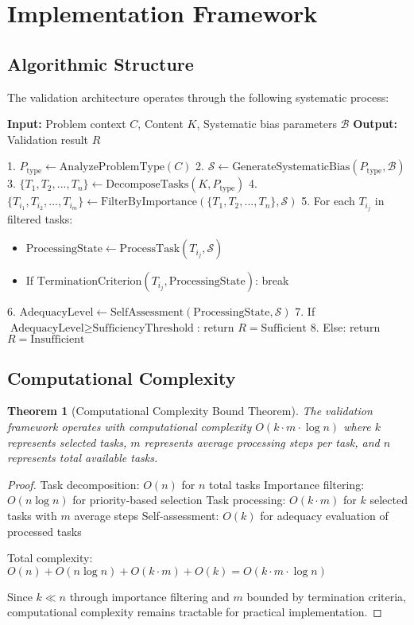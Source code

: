 \documentclass[12pt,a4paper]{article}
\newtheorem{theorem}{Theorem}
\begin{document}
\section{Implementation Framework}

\subsection{Algorithmic Structure}

The validation architecture operates through the following systematic process:

\begin{algorithm}
\textbf{Input:} Problem context $C$, Content $K$, Systematic bias parameters $\mathcal{B}$
\textbf{Output:} Validation result $R$

1. $P_{\text{type}} \leftarrow \text{AnalyzeProblemType}(C)$
2. $\mathcal{S} \leftarrow \text{GenerateSystematicBias}(P_{\text{type}}, \mathcal{B})$
3. $\{T_1, T_2, ..., T_n\} \leftarrow \text{DecomposeTasks}(K, P_{\text{type}})$
4. $\{T_{i_1}, T_{i_2}, ..., T_{i_m}\} \leftarrow \text{FilterByImportance}(\{T_1, T_2, ..., T_n\}, \mathcal{S})$
5. For each $T_{i_j}$ in filtered tasks:
   \begin{itemize}
   \item $\text{ProcessingState} \leftarrow \text{ProcessTask}(T_{i_j}, \mathcal{S})$
   \item If $\text{TerminationCriterion}(T_{i_j}, \text{ProcessingState})$: break
   \end{itemize}
6. $\text{AdequacyLevel} \leftarrow \text{SelfAssessment}(\text{ProcessingState}, \mathcal{S})$
7. If $\text{AdequacyLevel} \geq \text{SufficiencyThreshold}$: return $R = \text{Sufficient}$
8. Else: return $R = \text{Insufficient}$
\end{algorithm}

\subsection{Computational Complexity}

\begin{theorem}[Computational Complexity Bound Theorem]
The validation framework operates with computational complexity $O(k \cdot m \cdot \log n)$ where $k$ represents selected tasks, $m$ represents average processing steps per task, and $n$ represents total available tasks.
\end{theorem}

\begin{proof}
Task decomposition: $O(n)$ for $n$ total tasks
Importance filtering: $O(n \log n)$ for priority-based selection
Task processing: $O(k \cdot m)$ for $k$ selected tasks with $m$ average steps
Self-assessment: $O(k)$ for adequacy evaluation of processed tasks

Total complexity: $O(n) + O(n \log n) + O(k \cdot m) + O(k) = O(k \cdot m \cdot \log n)$

Since $k \ll n$ through importance filtering and $m$ bounded by termination criteria, computational complexity remains tractable for practical implementation.
\end{proof}
\end{document}
